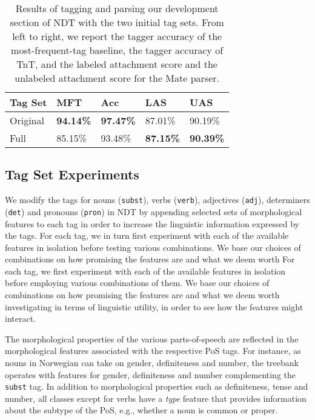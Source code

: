 \documentclass[11pt,a4paper]{article}
\begin{document}
\begin{table}
    \centering
    \smaller[0.5]
    \begin{tabular}{@{}lllll@{}}
        \toprule
        \textbf{Tag Set} & \textbf{MFT} & \textbf{Acc} &
        \textbf{LAS} & \textbf{UAS} \\
        \midrule
        Original & \textbf{94.14\%} & \textbf{97.47\%} & 87.01\% & 90.19\% \\
        Full & 85.15\% & 93.48\% & \textbf{87.15\%} & \textbf{90.39\%} \\
        \bottomrule
    \end{tabular}
    \caption{Results of tagging and parsing our development section of NDT with
        the two initial tag sets. From left to right, we report the tagger
        accuracy of the most-frequent-tag baseline, the tagger accuracy of TnT,
        and the labeled attachment score and the unlabeled attachment score for
        the Mate parser.}
    \label{inittagseteval}
\end{table}

\subsection{Tag Set Experiments}
We modify the tags for nouns (\texttt{subst}), verbs (\texttt{verb}),
adjectives (\texttt{adj}), determiners (\texttt{det}) and pronouns
(\texttt{pron}) in NDT by appending selected sets of morphological features to
each tag in order to increase the linguistic information expressed by the tags.
For each tag, we in turn first experiment with each of the available features in
isolation before testing various combinations. We base our choices
of combinations on how promising the features are and what we deem worth
For each tag, we first experiment with each of the available features in
isolation before employing various combinations of them. We base our choices of
combinations on how promising the features are and what we deem worth
investigating in terms of linguistic utility, in order to see how the features
might interact.

The morphological properties of the various parts-of-speech are reflected in
the morphological features associated with the respective PoS tags. For
instance, as nouns in Norwegian can take on gender, definiteness and number,
the treebank operates with features for gender, definiteness and number
complementing the \texttt{subst} tag. In addition to morphological properties
such as definiteness, tense and number, all classes except for verbs have a
\emph{type} feature that provides information about the subtype of the PoS,
e.g., whether a noun is common or proper.
\end{document}
